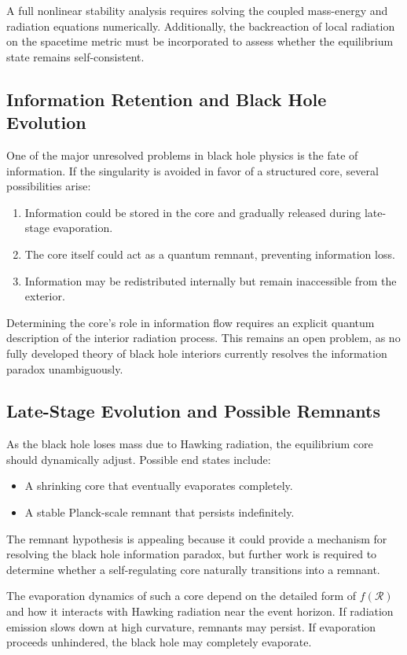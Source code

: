 A full nonlinear stability analysis requires solving the coupled mass-energy and radiation equations numerically. Additionally, the backreaction of local radiation on the spacetime metric must be incorporated to assess whether the equilibrium state remains self-consistent.

\subsection{Information Retention and Black Hole Evolution}
One of the major unresolved problems in black hole physics is the fate of information. If the singularity is avoided in favor of a structured core, several possibilities arise:
\begin{enumerate}
    \item Information could be stored in the core and gradually released during late-stage evaporation.
    \item The core itself could act as a quantum remnant, preventing information loss.
    \item Information may be redistributed internally but remain inaccessible from the exterior.
\end{enumerate}
Determining the core’s role in information flow requires an explicit quantum description of the interior radiation process. This remains an open problem, as no fully developed theory of black hole interiors currently resolves the information paradox unambiguously.

\subsection{Late-Stage Evolution and Possible Remnants}
As the black hole loses mass due to Hawking radiation, the equilibrium core should dynamically adjust. Possible end states include:
\begin{itemize}
    \item A shrinking core that eventually evaporates completely.
    \item A stable Planck-scale remnant that persists indefinitely.
\end{itemize}
The remnant hypothesis is appealing because it could provide a mechanism for resolving the black hole information paradox, but further work is required to determine whether a self-regulating core naturally transitions into a remnant.

The evaporation dynamics of such a core depend on the detailed form of \( f(\mathcal{R}) \) and how it interacts with Hawking radiation near the event horizon. If radiation emission slows down at high curvature, remnants may persist. If evaporation proceeds unhindered, the black hole may completely evaporate.

